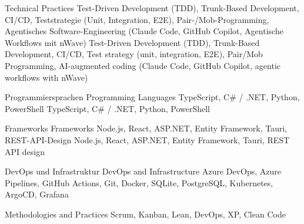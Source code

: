 {
}


\begin{cvskills}
	\cvskill
	{
		{Technical Practices}
	}
	{
		{
			Test-Driven Development (TDD), Trunk-Based Development, CI/CD, \linebreak
			Teststrategie (Unit, Integration, E2E), Pair-/Mob-Programming, \linebreak
			Agentisches Software-Engineering (Claude Code, GitHub Copilot, Agentische Workflows mit nWave)
		}
		{
			Test-Driven Development (TDD), Trunk-Based Development, CI/CD, \linebreak
			Test strategy (unit, integration, E2E), Pair/Mob Programming, \linebreak
			AI-augmented coding (Claude Code, GitHub Copilot, agentic workflows with nWave)
		}
	}

  \cvskill
    {
    		{ Programmiersprachen	}
    		{ Programming Languages }
    } %
    {
    		{TypeScript, C\# / .NET, Python, PowerShell}
    		{TypeScript, C\# / .NET, Python, PowerShell}
    } %

  \cvskill
    {
    		{ Frameworks }
    		{ Frameworks }
    } %
    {
    		{Node.js, React, ASP.NET, Entity Framework, Tauri, REST-API-Design}
    		{Node.js, React, ASP.NET, Entity Framework, Tauri, REST API design}
    } %

  \cvskill
    {
    		{ DevOps und Infrastruktur }
    		{ DevOps and Infrastructure }
    } %
    {Azure DevOps, Azure Pipelines, GitHub Actions, Git, Docker, SQLite, PostgreSQL, \linebreak Kubernetes, ArgoCD, Grafana} %

	\cvskill
	{
		{Methodologies and Practices}
	}
	{Scrum, Kanban, Lean, DevOps, XP, Clean Code}


\end{cvskills}
